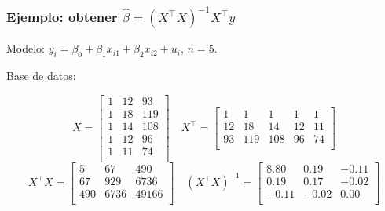 \documentclass{beamer}
\begin{document}
\begin{frame}[shrink=10]
\frametitle{Ejemplo: obtener $\hat{\beta} = (X^\top X)^{-1}X^\top y$}

Modelo: $y_i = \beta_0 + \beta_1 x_{i1} + \beta_2 x_{i2} + u_i$, $n=5$.

Base de datos: \begin{center}
\end{center}

\[
X = \begin{bmatrix}
1 & 12 & 93 \\
1 & 18 & 119 \\
1 & 14 & 108 \\
1 & 12 & 96 \\
1 & 11 & 74 \\
\end{bmatrix} \quad 
X^\top = \begin{bmatrix}
1 & 1 & 1 & 1 & 1 \\
12 & 18 & 14 & 12 & 11 \\
93 & 119 & 108 & 96 & 74 \\
\end{bmatrix}
\]
\[
X^\top X = \begin{bmatrix}
5 & 67 & 490 \\
67 & 929 & 6736 \\
490 & 6736 & 49166 \\
\end{bmatrix}
\quad  (X^\top X)^{-1} =
\begin{bmatrix}
8.80 & 0.19 & -0.11 \\
0.19 & 0.17 & -0.02 \\
-0.11 & -0.02 & 0.00 \\
\end{bmatrix}
\]
\end{frame}
\end{document}
